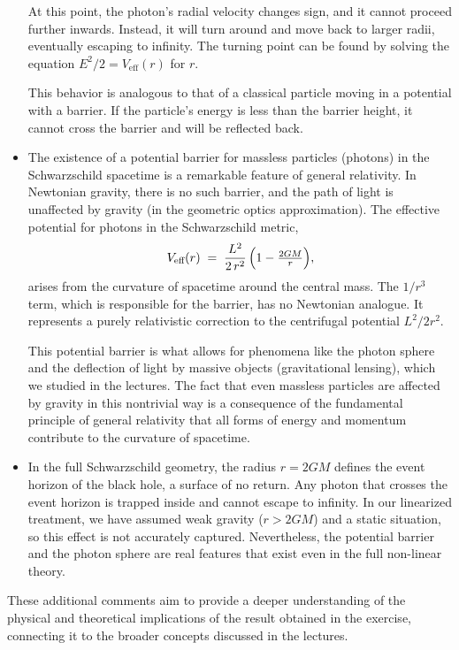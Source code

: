 \documentclass{article}
\begin{document}
\begin{itemize}
    At this point, the photon's radial velocity changes sign, and it cannot proceed further inwards. Instead, it will turn around and move back to larger radii, eventually escaping to infinity. The turning point can be found by solving the equation $E^2/2 = V_{\text{eff}}(r)$ for $r$.

    This behavior is analogous to that of a classical particle moving in a potential with a barrier. If the particle's energy is less than the barrier height, it cannot cross the barrier and will be reflected back.

    \item The existence of a potential barrier for massless particles (photons) in the Schwarzschild spacetime is a remarkable feature of general relativity. In Newtonian gravity, there is no such barrier, and the path of light is unaffected by gravity (in the geometric optics approximation). The effective potential for photons in the Schwarzschild metric,
    \[
    V_{\text{eff}}(r)
    \;=\;
    \frac{L^2}{2\,r^2}\,\Bigl(1-\tfrac{2GM}{r}\Bigr),
    \]
    arises from the curvature of spacetime around the central mass. The $1/r^3$ term, which is responsible for the barrier, has no Newtonian analogue. It represents a purely relativistic correction to the centrifugal potential $L^2/2r^2$.

    This potential barrier is what allows for phenomena like the photon sphere and the deflection of light by massive objects (gravitational lensing), which we studied in the lectures. The fact that even massless particles are affected by gravity in this nontrivial way is a consequence of the fundamental principle of general relativity that all forms of energy and momentum contribute to the curvature of spacetime.

    \item In the full Schwarzschild geometry, the radius $r=2GM$ defines the event horizon of the black hole, a surface of no return. Any photon that crosses the event horizon is trapped inside and cannot escape to infinity. In our linearized treatment, we have assumed weak gravity ($r>2GM$) and a static situation, so this effect is not accurately captured. Nevertheless, the potential barrier and the photon sphere are real features that exist even in the full non-linear theory.

\end{itemize}

These additional comments aim to provide a deeper understanding of the physical and theoretical implications of the result obtained in the exercise, connecting it to the broader concepts discussed in the lectures.
\end{document}
